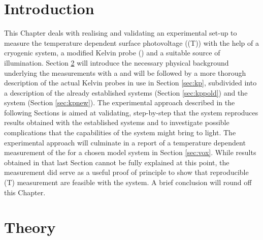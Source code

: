 \section{Introduction}
This Chapter deals with realising and validating an experimental set-up to measure the temperature dependent surface photovoltage (\spv{}(T)) with the help of a cryogenic system, a modified Kelvin probe (\kp{}) and a suitable source of illumination. Section \ref{sec:theo} will introduce the necessary physical background underlying the measurements with a \kp{} and will be followed by a more thorough description of the actual Kelvin probes in use in Section \ref{sec:kp}, subdivided into a description of the already established systems (Section \ref{sec:kppold}) and the  system (Section \ref{sec:kpnew}). The experimental approach described in the following Sections is aimed at validating, step-by-step that the  system reproduces results obtained with the established systems and to investigate possible complications that the capabilities of the  system might bring to light. The experimental approach will culminate in a report of a temperature dependent measurement of the \spv{} for a chosen model system in Section \ref{sec:vox}. While results obtained in that last Section cannot be fully explained at this point, the measurement did serve as a useful proof of principle to show that reproducible \spv{}(T) measurement are feasible with the system. A brief conclusion will round off this Chapter.

\section{Theory}
\label{sec:theo}
